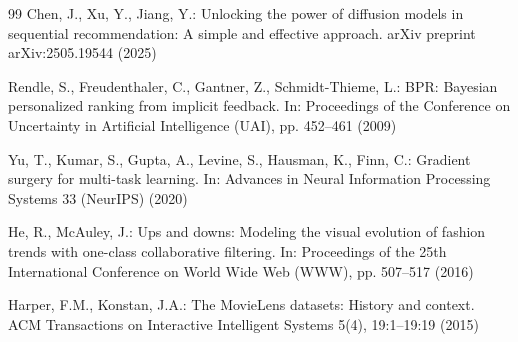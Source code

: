 \documentclass[runningheads,a4paper]{llncs}
\begin{document}
\begin{thebibliography}{99}
Chen, J., Xu, Y., Jiang, Y.: Unlocking the power of diffusion models in sequential recommendation: A simple and effective approach. arXiv preprint arXiv:2505.19544 (2025)

Rendle, S., Freudenthaler, C., Gantner, Z., Schmidt-Thieme, L.: BPR: Bayesian personalized ranking from implicit feedback. In: Proceedings of the Conference on Uncertainty in Artificial Intelligence (UAI), pp. 452--461 (2009)

Yu, T., Kumar, S., Gupta, A., Levine, S., Hausman, K., Finn, C.: Gradient surgery for multi-task learning. In: Advances in Neural Information Processing Systems 33 (NeurIPS) (2020)

He, R., McAuley, J.: Ups and downs: Modeling the visual evolution of fashion trends with one-class collaborative filtering. In: Proceedings of the 25th International Conference on World Wide Web (WWW), pp. 507--517 (2016)

Harper, F.M., Konstan, J.A.: The MovieLens datasets: History and context. ACM Transactions on Interactive Intelligent Systems 5(4), 19:1--19:19 (2015)

\end{thebibliography}
\end{document}
